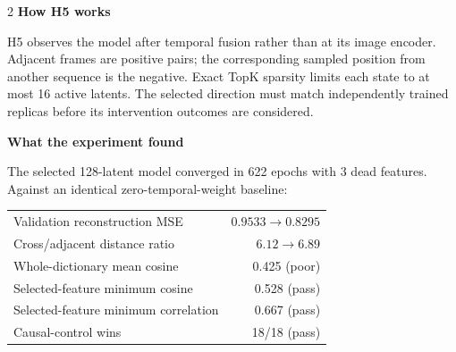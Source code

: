 \documentclass[9pt]{article}
\begin{document}
\vspace{5pt}
\begin{multicols}{2}
{\large\bfseries\color{hnavy} How H5 works}

\begin{center}
\end{center}

H5 observes the model after temporal fusion rather than at its image encoder.
Adjacent frames are positive pairs; the corresponding sampled position from
another sequence is the negative. Exact TopK sparsity limits each state to at
most 16 active latents. The selected direction must match independently trained
replicas before its intervention outcomes are considered.

\columnbreak
{\large\bfseries\color{hnavy} What the experiment found}

The selected 128-latent model converged in 622 epochs with 3 dead features.
Against an identical zero-temporal-weight baseline:

\begin{tabular}{@{}lr@{}}
Validation reconstruction MSE & $0.9533\rightarrow0.8295$ \\
Cross/adjacent distance ratio & $6.12\rightarrow6.89$ \\
Whole-dictionary mean cosine & 0.425 (poor) \\
Selected-feature minimum cosine & 0.528 (pass) \\
Selected-feature minimum correlation & 0.667 (pass) \\
Causal-control wins & 18/18 (pass) \\
\end{tabular}


\end{multicols}
\end{document}

